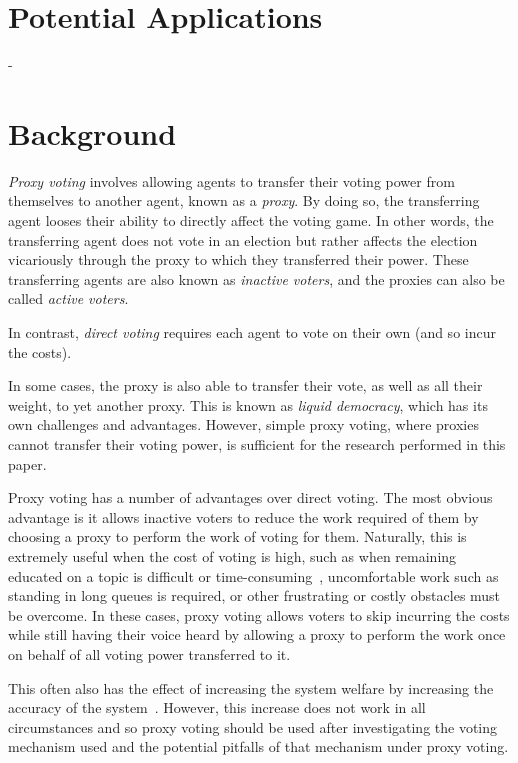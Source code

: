 \section{Potential Applications}\label{sec:potential-applications}
- %


\section{Background}\label{sec:background}
\textit{Proxy voting} involves allowing agents to transfer their voting power
from themselves to another agent, known as a \textit{proxy}\cite[para. 1.4]
{Cohensius2017}.
By doing so, the transferring agent looses their ability to directly affect the
voting game.
In other words, the transferring agent does not vote in an election but rather
affects the election vicariously through the proxy to which they transferred
their power.
These transferring agents are also known as \textit{inactive voters}, and the
proxies can also be called \textit{active voters}.

In contrast, \textit{direct voting} requires each agent to vote on their own
(and so incur the costs).

In some cases, the proxy is also able to transfer their vote, as well as all
their weight, to yet another proxy.
This is known as \textit{liquid democracy}, which has its own challenges and
advantages.
However, simple proxy voting, where proxies cannot transfer their voting power,
is sufficient for the research performed in this paper.

Proxy voting has a number of advantages over direct voting.
The most obvious advantage is it allows inactive voters to reduce the work
required of them by choosing a proxy to perform the work of voting for them.
Naturally, this is extremely useful when the cost of voting is high, such as
when remaining educated on a topic is difficult or
time-consuming~\cite[para 1.1]{Mueller1972}, uncomfortable work such as standing
in long queues is required, or other frustrating or costly obstacles must be
overcome.
In these cases, proxy voting allows voters to skip incurring the costs while
still having their voice heard by allowing a proxy to perform the work once on
behalf of all voting power transferred to it.

This often also has the effect of increasing the system welfare by
increasing the accuracy of the system~\cite[sec. 1.1]{Cohensius2017}.
However, this increase does not work in all circumstances and so proxy voting
should be used after investigating the voting mechanism used and the potential
pitfalls of that mechanism under proxy voting.

